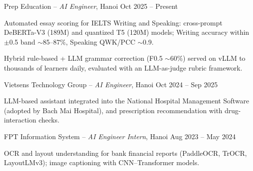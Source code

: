 \begin{cventries}
  \cventry
    {Prep Education -- \textnormal{\textit{AI Engineer}, Hanoi}}
    {Oct 2025 -- Present}
    {
      \begin{cvitems}
        \item {Automated essay scoring for IELTS Writing and Speaking: cross-prompt DeBERTa-V3 (189M) and quantized T5 (120M) models; Writing accuracy within $\pm$0.5 band $\sim$85--87\%, Speaking QWK/PCC $\sim$0.9.}
        \item {Hybrid rule-based + LLM grammar correction (F0.5 $\sim$60\%) served on vLLM to thousands of learners daily, evaluated with an LLM-as-judge rubric framework.}
      \end{cvitems}
    }

\vspace{8pt}

  \cventry
    {Vietsens Technology Group -- \textnormal{\textit{AI Engineer}, Hanoi}}
    {Oct 2024 -- Sep 2025}
    {
      \begin{cvitems}
        \item {LLM-based assistant integrated into the National Hospital Management Software (adopted by Bach Mai Hospital), and prescription recommendation with drug-interaction checks.}
      \end{cvitems}
    }

\vspace{8pt}

  \cventry
    {FPT Information System -- \textnormal{\textit{AI Engineer Intern}, Hanoi}}
    {Aug 2023 -- May 2024}
    {
      \begin{cvitems}
        \item {OCR and layout understanding for bank financial reports (PaddleOCR, TrOCR, LayoutLMv3); image captioning with CNN--Transformer models.}
      \end{cvitems}
    }
\end{cventries}

\vspace{10pt}
